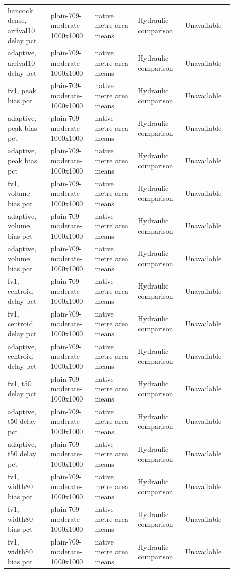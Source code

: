 \begin{longtable}{p{0.1760\linewidth}p{0.1760\linewidth}p{0.1760\linewidth}p{0.1760\linewidth}p{0.1760\linewidth}}
hancock dense, arrival10 delay pct & plain-709-moderate-1000x1000 & native metre area means & Hydraulic comparison & Unavailable \\
adaptive, arrival10 delay pct & plain-709-moderate-1000x1000 & native metre area means & Hydraulic comparison & Unavailable \\
fv1, peak bias pct & plain-709-moderate-1000x1000 & native metre area means & Hydraulic comparison & Unavailable \\
adaptive, peak bias pct & plain-709-moderate-1000x1000 & native metre area means & Hydraulic comparison & Unavailable \\
adaptive, peak bias pct & plain-709-moderate-1000x1000 & native metre area means & Hydraulic comparison & Unavailable \\
fv1, volume bias pct & plain-709-moderate-1000x1000 & native metre area means & Hydraulic comparison & Unavailable \\
adaptive, volume bias pct & plain-709-moderate-1000x1000 & native metre area means & Hydraulic comparison & Unavailable \\
adaptive, volume bias pct & plain-709-moderate-1000x1000 & native metre area means & Hydraulic comparison & Unavailable \\
fv1, centroid delay pct & plain-709-moderate-1000x1000 & native metre area means & Hydraulic comparison & Unavailable \\
fv1, centroid delay pct & plain-709-moderate-1000x1000 & native metre area means & Hydraulic comparison & Unavailable \\
adaptive, centroid delay pct & plain-709-moderate-1000x1000 & native metre area means & Hydraulic comparison & Unavailable \\
fv1, t50 delay pct & plain-709-moderate-1000x1000 & native metre area means & Hydraulic comparison & Unavailable \\
adaptive, t50 delay pct & plain-709-moderate-1000x1000 & native metre area means & Hydraulic comparison & Unavailable \\
adaptive, t50 delay pct & plain-709-moderate-1000x1000 & native metre area means & Hydraulic comparison & Unavailable \\
fv1, width80 bias pct & plain-709-moderate-1000x1000 & native metre area means & Hydraulic comparison & Unavailable \\
fv1, width80 bias pct & plain-709-moderate-1000x1000 & native metre area means & Hydraulic comparison & Unavailable \\
fv1, width80 bias pct & plain-709-moderate-1000x1000 & native metre area means & Hydraulic comparison & Unavailable \\

\end{longtable}
